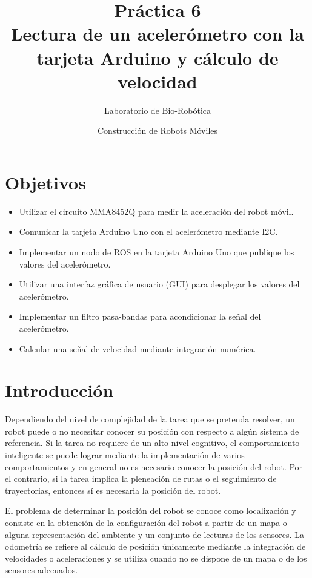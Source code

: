\documentclass[letterpaper,12pt]{article}
\title{Práctica 6 \\ Lectura de un acelerómetro con la tarjeta Arduino y cálculo de velocidad}
\author{Laboratorio de Bio-Robótica}
\date{Construcción de Robots Móviles}
\begin{document}
\renewcommand{\tablename}{Tabla}
\maketitle
\section*{Objetivos}
\begin{itemize}
\item Utilizar el circuito MMA8452Q para medir la aceleración del robot móvil. 
\item Comunicar la tarjeta Arduino Uno con el acelerómetro mediante I2C.
\item Implementar un nodo de ROS en la tarjeta Arduino Uno que publique los valores del acelerómetro. 
\item Utilizar una interfaz gráfica de usuario (GUI) para desplegar los valores del acelerómetro. 
\item Implementar un filtro pasa-bandas para acondicionar la señal del acelerómetro.
\item Calcular una señal de velocidad mediante integración numérica. 
\end{itemize}

\section{Introducción}
Dependiendo del nivel de complejidad de la tarea que se pretenda resolver, un robot puede o no necesitar conocer su posición con respecto a algún sistema de referencia. Si la tarea no requiere de un alto nivel cognitivo, el comportamiento inteligente se puede lograr mediante la implementación de varios comportamientos y en general no es necesario conocer la posición del robot. Por el contrario, si la tarea implica la pleneación de rutas o el seguimiento de trayectorias, entonces sí es necesaria la posición del robot. 

El problema de determinar la posición del robot se conoce como localización y consiste en la obtención de la configuración del robot a partir de un mapa o alguna representación del ambiente y un conjunto de lecturas de los sensores. La odometría se refiere al cálculo de posición únicamente mediante la integración de velocidades o aceleraciones y se utiliza cuando no se dispone de un mapa o de los sensores adecuados. 
\end{document}
